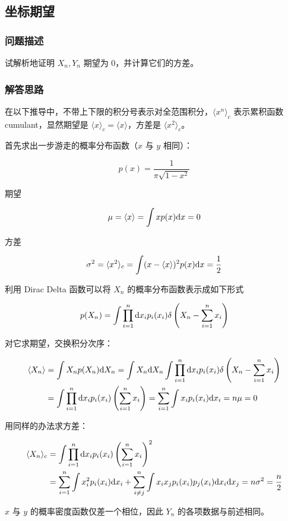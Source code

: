 \documentclass{ctexart}
\begin{document}
\subsection{坐标期望}
\subsubsection{问题描述}

试解析地证明 $X_n,Y_n$ 期望为 0，并计算它们的方差。
\subsubsection{解答思路}
在以下推导中，不带上下限的积分号表示对全范围积分，$\langle x^n\rangle_c$ 表示累积函数 cumulant，显然期望是 $\langle x\rangle_c=\langle x\rangle$，方差是 $\langle x^2\rangle_c$。

首先求出一步游走的概率分布函数（$x$ 与 $y$ 相同）：

\[
p(x)=\frac1{\pi\sqrt{1-x^2}}
\]

期望

\[
\mu=\langle x\rangle=\int x p(x)\mathrm{d} x=0
\]

方差

\[
\sigma^2=\langle x^2\rangle_c=\int (x-\langle x\rangle)^2 p(x)\mathrm{d} x=\frac12
\]

利用 Dirac Delta 函数可以将 $X_n$ 的概率分布函数表示成如下形式

\[
p(X_n)=\int \prod_{i=1}^n \mathrm{d} x_{i} p_i(x_i) \delta\left(X_n-\sum_{i=1}^{n} x_{i}\right)
\]

对它求期望，交换积分次序：

\begin{align*}
\langle X_n\rangle&=\int X_n p(X_n)\mathrm{d} X_n=\int X_n \mathrm{d} X_n
\int \prod_{i=1}^n \mathrm{d} x_{i} p_i(x_i) \delta\left(X_n-\sum_{i=1}^{n} x_{i}\right)
\\
&=\int \prod_{i=1}^n \mathrm{d} x_{i} p_i(x_i) \left(\sum_{i=1}^{n} x_{i}\right)=\sum_{i=1}^{n}\int x_{i}p_i(x_i)\mathrm{d} x_i=n\mu=0
\end{align*}

用同样的办法求方差：

\begin{align*}
\langle X_n\rangle_c&=\int \prod_{i=1}^n \mathrm{d} x_{i} p_i(x_i) \left(\sum_{i=1}^{n} x_{i}\right)^2
\\
&=\sum_{i=1}^{n}\int x_{i}^2p_i(x_i)\mathrm{d} x_i+\sum_{i\ne j}^{n}\int x_{i} x_{j} p_i(x_i) p_j(x_i)\mathrm{d} x_i\mathrm{d} x_j=n\sigma^2=\frac n2
\end{align*}

$x$ 与 $y$ 的概率密度函数仅差一个相位，因此 $Y_n$ 的各项数据与前述相同。
\end{document}
